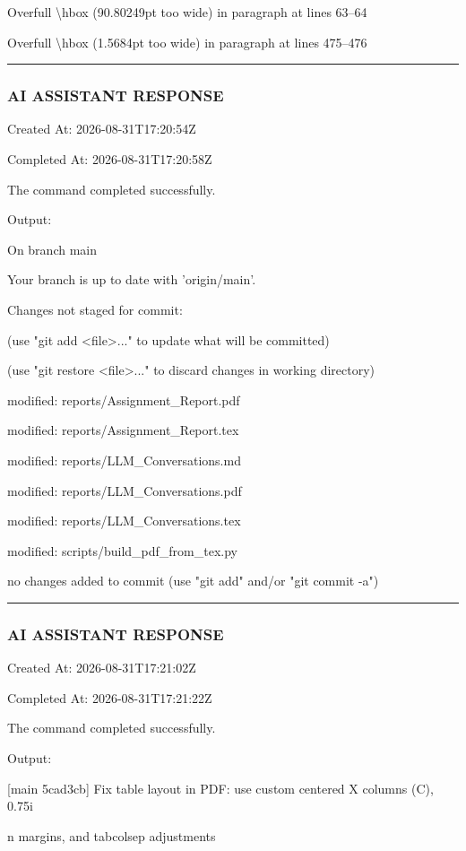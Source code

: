 \documentclass[11pt,a4paper]{article}
\begin{document}
Overfull \textbackslash{}hbox (90.80249pt too wide) in paragraph at lines 63--64

Overfull \textbackslash{}hbox (1.5684pt too wide) in paragraph at lines 475--476


\hrule

\subsubsection{AI ASSISTANT RESPONSE}

Created At: 2026-08-31T17:20:54Z

Completed At: 2026-08-31T17:20:58Z


The command completed successfully.

Output:

On branch main

Your branch is up to date with 'origin/main'.


Changes not staged for commit:

(use "git add <file>..." to update what will be committed)

(use "git restore <file>..." to discard changes in working directory)

modified:   reports/Assignment\_Report.pdf

modified:   reports/Assignment\_Report.tex

modified:   reports/LLM\_Conversations.md

modified:   reports/LLM\_Conversations.pdf

modified:   reports/LLM\_Conversations.tex

modified:   scripts/build\_pdf\_from\_tex.py


no changes added to commit (use "git add" and/or "git commit -a")


\hrule

\subsubsection{AI ASSISTANT RESPONSE}

Created At: 2026-08-31T17:21:02Z

Completed At: 2026-08-31T17:21:22Z


The command completed successfully.

Output:

[main 5cad3cb] Fix table layout in PDF: use custom centered X columns (C), 0.75i

n margins, and tabcolsep adjustments
\end{document}
